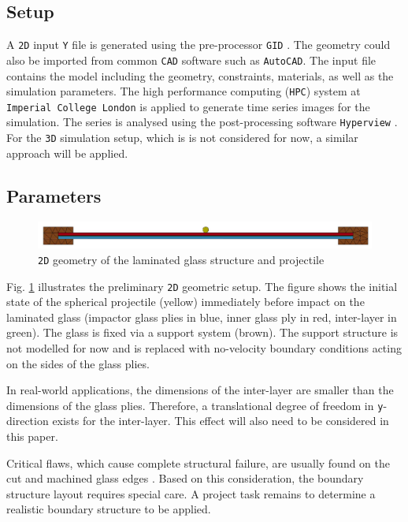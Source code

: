 \documentclass[12pt,twoside]{article}
\theoremstyle{break}
\begin{document}
\subsection{Setup}

A \texttt{2D} input \texttt{Y} file is generated using the pre-processor \texttt{GID} \cite{GID11}. The geometry could also be imported from common \texttt{CAD} software such as \texttt{AutoCAD}. The input file contains the model including the geometry, constraints, materials, as well as the simulation parameters. The high performance computing (\texttt{HPC}) system at \texttt{Imperial College London} is applied to generate time series images for the simulation. The series is analysed using the post-processing software \texttt{Hyperview} \cite{Hyp17}. For the \texttt{3D} simulation setup, which is is not considered for now, a similar approach will be applied.

\subsection{Parameters}

\begin{figure}[h!]
    \centering
    \includegraphics[width=\textwidth]{Geometry}
    \caption{\texttt{2D} geometry of the laminated glass structure and projectile \cite{Che18}}
    \label{fig:geometry}
\end{figure}

Fig. \ref{fig:geometry} illustrates the preliminary \texttt{2D} geometric setup. The figure shows the initial state of the spherical projectile (yellow) immediately before impact on the laminated glass (impactor glass plies in blue, inner glass ply in red, inter-layer in green). The glass is fixed via a support system (brown). The support structure is not modelled for now and is replaced with no-velocity boundary conditions acting on the sides of the glass plies. 

\bigbreak
In real-world applications, the dimensions of the inter-layer are smaller than the dimensions of the glass plies. Therefore, a translational degree of freedom in \texttt{y}-direction exists for the inter-layer. This effect will also need to be considered in this paper.

\bigbreak
Critical flaws, which cause complete structural failure, are usually found on the cut and machined glass edges \cite{Pel16}. Based on this consideration, the boundary structure layout requires special care. A project task remains to determine a realistic boundary structure to be applied.
\end{document}
